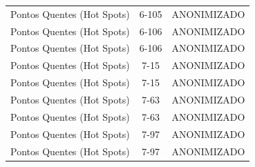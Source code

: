 \documentclass[dvipsnames]{article}%
\begin{document}
\begin{table}[h!]
\begin{tabular}{lcl}
Pontos Quentes (Hot Spots)&6{-}105&ANONIMIZADO\\%
Pontos Quentes (Hot Spots)&6{-}106&ANONIMIZADO\\%
Pontos Quentes (Hot Spots)&6{-}106&ANONIMIZADO\\%
Pontos Quentes (Hot Spots)&7{-}15&ANONIMIZADO\\%
Pontos Quentes (Hot Spots)&7{-}15&ANONIMIZADO\\%
Pontos Quentes (Hot Spots)&7{-}63&ANONIMIZADO\\%
Pontos Quentes (Hot Spots)&7{-}63&ANONIMIZADO\\%
Pontos Quentes (Hot Spots)&7{-}97&ANONIMIZADO\\%
Pontos Quentes (Hot Spots)&7{-}97&ANONIMIZADO\\%
\bottomrule%
\end{tabular}%
\end{table}

%
\FloatBarrier%
\end{document}
